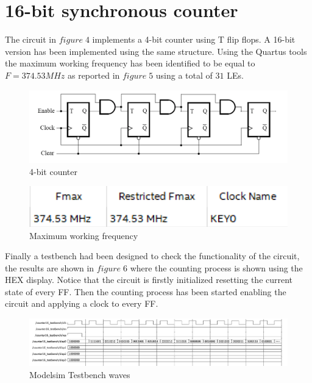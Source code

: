 \documentclass[12pt]{article}
\begin{document}
\section{16-bit synchronous counter}

The circuit in $figure\;4$ implements a 4-bit counter using T flip flops. A 16-bit version has been implemented using the same structure. Using the Quartus tools the maximum working frequency has been identified to be equal to $F=374.53MHz$ as reported in $figure\;5$ using a total of $31$ LEs.



\vspace{10mm}
\begin{figure}[h]
	\centering
	\includegraphics[scale = 0.8]{immagini/count.PNG}
	\caption{4-bit counter}
\end{figure}
\vspace{10mm}
	\begin{figure}[h]
		\centering
		\includegraphics[scale = 0.9]{immagini/fmax.PNG}
		\caption{Maximum working frequency}
	\end{figure}
\newpage
Finally a testbench had been designed to check the functionality of the circuit, the results are shown in $figure\;6$ where the counting process is shown using the HEX display. Notice that the circuit is firstly initialized resetting the current state of every FF. Then the counting process has been started enabling the circuit and applying a clock to every FF.
		\begin{figure}[h]
			\centering
			\includegraphics[scale = 0.6]{immagini/testbench2.PNG}
			\caption{Modelsim Testbench waves}
\end{figure}
\end{document}
